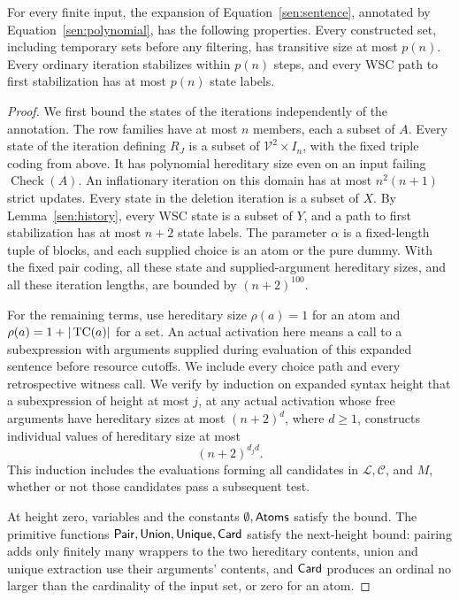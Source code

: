 \begin{lemma}\label{sen:resources}
For every finite input, the expansion of
Equation~\eqref{sen:sentence}, annotated by
Equation~\eqref{sen:polynomial}, has the following properties.
Every constructed set, including temporary sets before any filtering,
has transitive size at most \(p(n)\). Every ordinary iteration
stabilizes within \(p(n)\) steps, and every WSC path to first
stabilization has at most \(p(n)\) state labels.
\end{lemma}
\begin{proof}
We first bound the states of the iterations independently of the
annotation. The row families have at most \(n\) members, each a subset
of \(A\). Every state of the iteration defining \(R_J\) is a subset of
\(\mathcal V^2\times I_n\), with the fixed triple coding from above.
It has polynomial hereditary size even on an input failing
\(\operatorname{Check}(A)\). An inflationary iteration on this domain
has at most \(n^2(n+1)\) strict updates. Every state in the deletion
iteration is a subset of \(X\). By Lemma~\ref{sen:history}, every WSC
state is a subset of \(Y\), and a path to first stabilization has at most
\(n+2\) state labels. The parameter \(\alpha\) is a fixed-length tuple
of blocks, and each supplied choice is an atom or the pure dummy.
With the fixed pair coding, all these state and supplied-argument
hereditary sizes, and all these iteration lengths, are bounded by
\((n+2)^{100}\).

For the remaining terms, use hereditary size
\(\rho(a)=1\) for an atom and \(\rho(a)=1+|\operatorname{TC}(a)|\) for a set.
An actual activation here means a call to a subexpression with arguments
supplied during evaluation of this expanded sentence before resource
cutoffs. We include every choice path and every retrospective witness
call.
We verify by induction on expanded syntax height that a subexpression
of height at most \(j\), at any actual activation whose free arguments
have hereditary sizes at most \((n+2)^d\), where \(d\geq1\), constructs
individual values of hereditary size at most
\[
                              (n+2)^{d_jd}.
\]
This induction includes the evaluations forming all candidates in
\(\mathcal L,\mathcal C\), and \(M\), whether or not those candidates
pass a subsequent test.

At height zero, variables and the constants \(\emptyset,\mathsf{Atoms}\) satisfy
the bound. The primitive functions \(\mathsf{Pair},\mathsf{Union},\mathsf{Unique},\mathsf{Card}\)
satisfy the next-height bound: pairing adds only finitely many wrappers
to the two hereditary contents, union and unique extraction use their
arguments' contents, and \(\mathsf{Card}\) produces an ordinal no larger than
the cardinality of the input set, or zero for an atom.


\end{proof}
